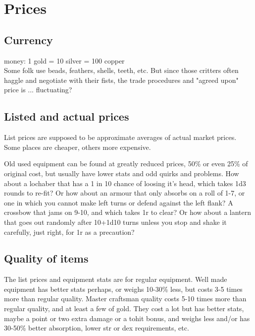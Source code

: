 

\cleardoublepage

\chapter*{Prices}




\section*{Currency}
money: 1 gold = 10 silver = 100 copper\\
Some folk use beads, feathers, shells, teeth, etc. But since those critters often haggle and negotiate with their fists, the trade procedures and "agreed upon" price is ... fluctuating?




\section*{Listed and actual prices}
List prices are supposed to be approximate averages of actual market prices. Some places are cheaper, others more expensive.

Old used equipment can be found at greatly reduced prices, 50\% or even 25\% of original cost, but usually have lower stats and odd quirks and problems. How about a lochaber that has a 1 in 10 chance of loosing it's head, which takes 1d3 rounds to re-fit? Or how about an armour that only absorbs on a roll of 1-7, or one in which you cannot make left turns or defend against the left flank? A crossbow that jams on 9-10, and which takes 1r to clear? Or how about a lantern that goes out randomly after 10+1d10 turns unless you stop and shake it carefully, just right, for 1r as a precaution?


\section*{Quality of items}
The list prices and equipment stats are for regular equipment. Well made equipment has better stats perhaps, or weighs 10-30\% less, but costs 3-5 times more than regular quality. Master craftsman quality costs 5-10 times more than regular quality, and at least a few of gold. They cost a lot but has better stats, maybe a point or two extra damage or a tohit bonus, and weighs less and/or has 30-50\% better absorption, lower str or dex requirements, etc.

